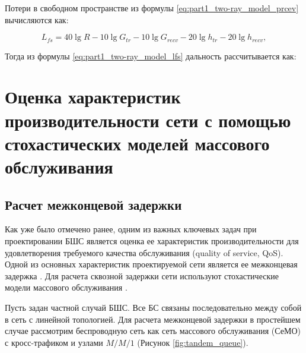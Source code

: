 Потери в свободном пространстве из формулы \cref{eq:part1_two-ray_model_prcev} вычисляются как:

\begin{equation}
  \label{eq:part1_two-ray_model_lfs}
  L_{fs} = 40\lg{R} - 10\lg{G_{tr}} - 10\lg{G_{recv}} - 20\lg{h_{tr}} - 20\lg{h_{recv}},
\end{equation}

Тогда из формулы \cref{eq:part1_two-ray_model_lfs} дальность рассчитывается как:




\subsection{}

\section{Оценка характеристик производительности сети с помощью стохастических моделей массового обслуживания}

\subsection{}

\subsection{Расчет межконцевой задержки}\label{part4_e2e_delay_section}

Как уже было отмечено ранее, одним из важных ключевых задач при проектировании БШС является оценка ее характеристик производительности для удовлетворения требуемого качества обслуживания (quality of service, QoS). Одной из основных характеристик проектируемой сети является ее межконцевая задержка \cite{Vishnevsky2016_Methods_of_performance, Wang2017, Liu2016, Chen2019, Hosni2017, Capone2019, Abbas2017, Seliem2019, Malandra2018, Kalor2018, Larionov2019, Gao2016}. Для расчета сквозной задержки сети используют стохастические модели массового обслуживания \cite{Vishnevsky2016_Methods_of_performance, Wang2017, Liu2016, Malandra2018, Larionov2019, Gao2016}. 

Пусть задан частной случай БШС. Все БС связаны последовательно между собой в сеть с линейной топологией. Для расчета межконцевой задержки в простейшем случае рассмотрим беспроводную сеть как сеть массового обслуживания (СеМО) с кросс-трафиком и узлами $M/M/1$ (Рисунок \cref{fig:tandem_queue}). 


